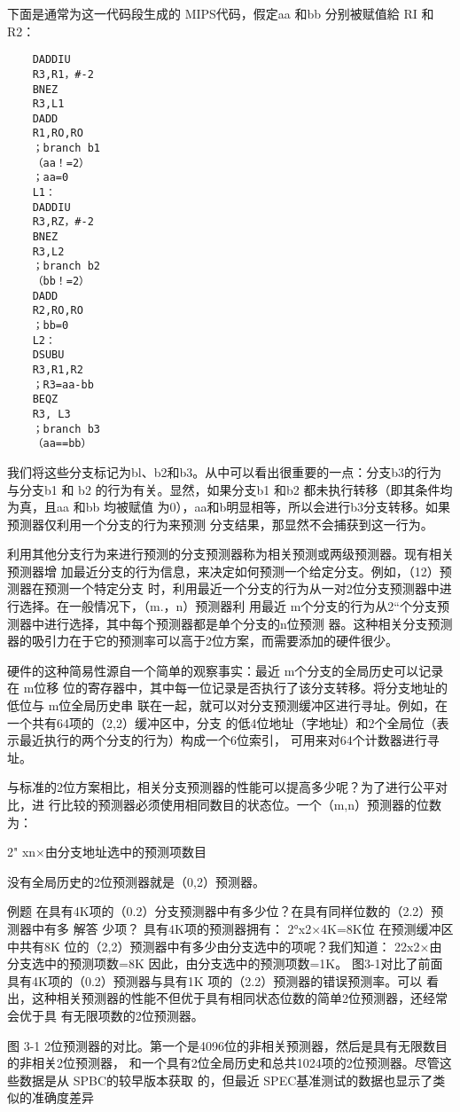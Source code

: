下面是通常为这一代码段生成的 MIPS代码，假定aa 和bb 分别被赋值給 RI 和 R2：
\begin{verbatim}
    DADDIU
    R3,R1，#-2
    BNEZ
    R3,L1
    DADD
    R1,RO,RO
    ；branch b1
    （aa！=2）
    ；aa=0
    L1：
    DADDIU
    R3,RZ，#-2
    BNEZ
    R3,L2
    ；branch b2
    （bb！=2）
    DADD
    R2,RO,RO
    ；bb=0
    L2：
    DSUBU
    R3,R1,R2
    ；R3=aa-bb
    BEQZ
    R3, L3
    ；branch b3
    （aa==bb）
\end{verbatim}
我们将这些分支标记为bl、b2和b3。从中可以看出很重要的一点：分支b3的行为与分支b1 和
b2 的行为有关。显然，如果分支b1 和b2 都未执行转移（即其条件均为真，且aa 和bb 均被赋值
为0），aa和b明显相等，所以会进行b3分支转移。如果预测器仅利用一个分支的行为来预测
分支结果，那显然不会捕获到这一行为。

利用其他分支行为来进行预测的分支预测器称为相关预测或两级预测器。现有相关预测器增
加最近分支的行为信息，来决定如何预测一个给定分支。例如，（12）预测器在预测一个特定分支
时，利用最近一个分支的行为从一对2位分支预测器中进行选择。在一般情况下，（m.，n）预测器利
用最近 m个分支的行为从2“个分支预测器中进行选择，其中每个预测器都是单个分支的n位预测
器。这种相关分支预测器的吸引力在于它的预测率可以高于2位方案，而需要添加的硬件很少。

硬件的这种简易性源自一个简单的观察事实：最近 m个分支的全局历史可以记录在 m位移
位的寄存器中，其中每一位记录是否执行了该分支转移。将分支地址的低位与 m位全局历史串
联在一起，就可以对分支预测缓冲区进行寻址。例如，在一个共有64项的（2,2）缓冲区中，分支
的低4位地址（字地址）和2个全局位（表示最近执行的两个分支的行为）构成一个6位索引，
可用来对64个计数器进行寻址。

与标准的2位方案相比，相关分支预测器的性能可以提高多少呢？为了进行公平对比，进
行比较的预测器必须使用相同数目的状态位。一个（m,n）预测器的位数为：

2" xn×由分支地址选中的预测项数目

没有全局历史的2位预测器就是（0,2）预测器。

例题
在具有4K项的（0.2）分支预测器中有多少位？在具有同样位数的（2.2）预测器中有多
解答
少项？
具有4K项的预测器拥有：
2°x2×4K=8K位
在预测缓冲区中共有8K 位的（2,2）预测器中有多少由分支选中的项呢？我们知道：
22x2×由分支选中的预测项数=8K
因此，由分支选中的预测项数=1K。
图3-1对比了前面具有4K项的（0.2）预测器与具有1K 项的（2.2）预测器的错误预测率。可以
看出，这种相关预测器的性能不但优于具有相同状态位数的简单2位预测器，还经常会优于具
有无限项数的2位预测器。

图 3-1
2位预测器的对比。第一个是4096位的非相关预测器，然后是具有无限数目的非相关2位预测器，
和一个具有2位全局历史和总共1024项的2位预测器。尽管这些数据是从 SPBC的较早版本获取
的，但最近 SPEC基准测试的数据也显示了类似的准确度差异

